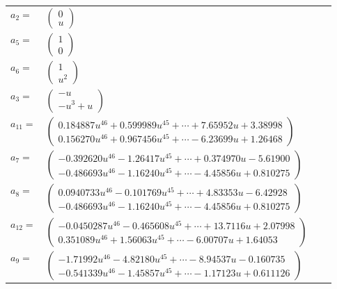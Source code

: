 \documentclass[1p]{elsarticle_modified}
\theoremstyle{definition}
\begin{document}
\begin{tabular}{m{7pt} m{180pt} m{7pt} m{180pt} }
\flushright $a_{2}=$&$\begin{pmatrix}0\\u\end{pmatrix}$ \\
\flushright $a_{5}=$&$\begin{pmatrix}1\\0\end{pmatrix}$ \\
\flushright $a_{6}=$&$\begin{pmatrix}1\\u^2\end{pmatrix}$ \\
\flushright $a_{3}=$&$\begin{pmatrix}- u\\- u^3+u\end{pmatrix}$ \\
\flushright $a_{11}=$&$\begin{pmatrix}0.184887 u^{46}+0.599989 u^{45}+\cdots+7.65952 u+3.38998\\0.156270 u^{46}+0.967456 u^{45}+\cdots-6.23699 u+1.26468\end{pmatrix}$ \\
\flushright $a_{7}=$&$\begin{pmatrix}-0.392620 u^{46}-1.26417 u^{45}+\cdots+0.374970 u-5.61900\\-0.486693 u^{46}-1.16240 u^{45}+\cdots-4.45856 u+0.810275\end{pmatrix}$ \\
\flushright $a_{8}=$&$\begin{pmatrix}0.0940733 u^{46}-0.101769 u^{45}+\cdots+4.83353 u-6.42928\\-0.486693 u^{46}-1.16240 u^{45}+\cdots-4.45856 u+0.810275\end{pmatrix}$ \\
\flushright $a_{12}=$&$\begin{pmatrix}-0.0450287 u^{46}-0.465608 u^{45}+\cdots+13.7116 u+2.07998\\0.351089 u^{46}+1.56063 u^{45}+\cdots-6.00707 u+1.64053\end{pmatrix}$ \\
\flushright $a_{9}=$&$\begin{pmatrix}-1.71992 u^{46}-4.82180 u^{45}+\cdots-8.94537 u-0.160735\\-0.541339 u^{46}-1.45857 u^{45}+\cdots-1.17123 u+0.611126\end{pmatrix}$ \\

\end{tabular}
\end{document}
